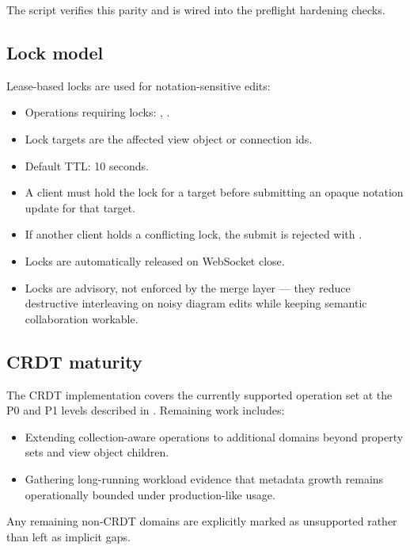 The script  verifies this parity
and is wired into the preflight hardening checks.

\subsection{Lock model}

Lease-based locks are used for notation-sensitive edits:

\begin{itemize}
\item Operations requiring locks: ,
  .
\item Lock targets are the affected view object or connection ids.
\item Default TTL: 10 seconds.
\item A client must hold the lock for a target before submitting an opaque
  notation update for that target.
\item If another client holds a conflicting lock, the submit is rejected
  with .
\item Locks are automatically released on WebSocket close.
\item Locks are advisory, not enforced by the merge layer --- they reduce
  destructive interleaving on noisy diagram edits while keeping semantic
  collaboration workable.
\end{itemize}

\subsection{CRDT maturity}

The CRDT implementation covers the currently supported operation set at the
P0 and P1 levels described in . Remaining work
includes:

\begin{itemize}
\item Extending collection-aware operations to additional domains beyond
  property sets and view object children.
\item Gathering long-running workload evidence that metadata growth remains
  operationally bounded under production-like usage.
\end{itemize}

Any remaining non-CRDT domains are explicitly marked as unsupported rather
than left as implicit gaps.
